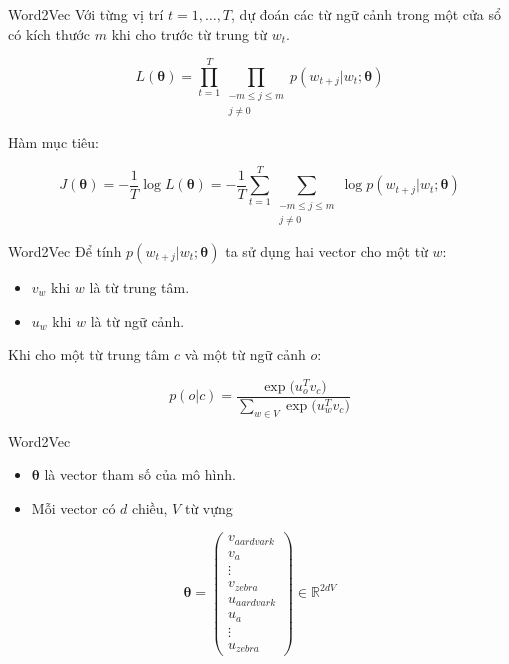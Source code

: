 \documentclass[10pt]{beamer}
\theoremstyle{remark}
\theoremstyle{definition}
\begin{document}
\begin{frame}{Word2Vec}
	Với từng vị trí $t=1,\dots, T$, dự đoán các từ ngữ cảnh trong một cửa sổ có kích thước $m$ khi cho trước từ trung từ $w_t$.

	\begin{equation*}
		L(\boldsymbol{\theta}) = \prod_{t=1}^T \prod_{\substack{-m \leq j \leq m\\j \neq 0}} p(w_{t+j} \vert w_t; \boldsymbol{\theta})
	\end{equation*}

	Hàm mục tiêu:

	\begin{equation*}
		J(\boldsymbol{\theta}) = -\dfrac{1}{T}\log L (\boldsymbol{\theta})=-\dfrac{1}{T} \sum_{t=1}^T \sum_{\substack{-m \leq j \leq m \\ j \neq 0}} \log p(w_{t + j} \vert w_t ; \boldsymbol{\theta})
	\end{equation*}
\end{frame}

\begin{frame}{Word2Vec}
	Để tính $p(w_{t + j} \vert w_t ; \boldsymbol{\theta})$ ta sử dụng hai vector cho một từ $w$:
	\begin{itemize}
		\item $v_w$ khi $w$ là từ trung tâm.
		\item $u_w$ khi $w$ là từ ngữ cảnh.
	\end{itemize}
	Khi cho một từ trung tâm $c$ và một từ ngữ cảnh $o$:

	\begin{equation*}
		p(o \vert c) = \dfrac{\exp\big( u_o^T v_c \big)}{\sum_{w \in V} \exp \big( u_w^T v_c \big)}
	\end{equation*}
\end{frame}

\begin{frame}{Word2Vec}
	\begin{itemize}
		\item $\boldsymbol{\theta}$ là vector tham số của mô hình.
		\item Mỗi vector có $d$ chiều, $V$ từ vựng
	\end{itemize}

	\begin{equation*}
		\boldsymbol{\theta} = \begin{pmatrix}
			v_{aardvark} \\ v_a \\ \vdots \\ v_{zebra} \\ u_{aardvark} \\ u_a \\ \vdots \\ u_{zebra}
		\end{pmatrix} \in \mathbb{R}^{2dV}
	\end{equation*}
\end{frame}
\end{document}
